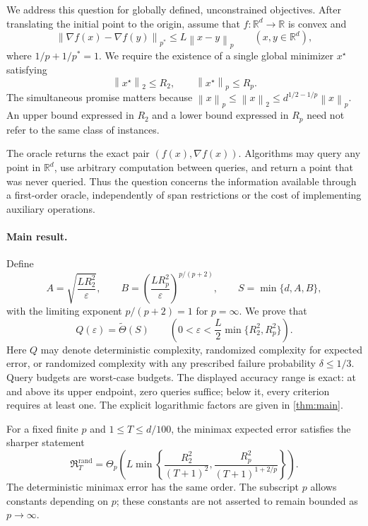\documentclass[11pt]{article}
\newcommand{\R}{\mathbb{R}}
\newcommand{\norm}[2]{\left\lVert #1\right\rVert_{#2}}
\newcommand{\Risk}{\mathfrak{R}}
\newcommand{\eps}{\varepsilon}
\theoremstyle{definition}
\theoremstyle{remark}
\begin{document}
We address this question for globally defined, unconstrained objectives.
After translating the initial point to the origin, assume that
$f:\R^d\to\R$ is convex and
\begin{equation}
\label{eq:intro-smooth}
 \norm{\nabla f(x)-\nabla f(y)}{p^*}
 \le L\norm{x-y}{p}\qquad(x,y\in\R^d),
\end{equation}
where $1/p+1/p^*=1$. We require the existence of a single global minimizer
$x^\star$ satisfying
\begin{equation}
\label{eq:intro-radii}
 \norm{x^\star}{2}\le R_2,
 \qquad \norm{x^\star}{p}\le R_p.
\end{equation}
The simultaneous promise matters because
$\norm{x}{p}\le\norm{x}{2}\le d^{1/2-1/p}\norm{x}{p}$.
An upper bound expressed in $R_2$ and a lower bound expressed in $R_p$
need not refer to the same class of instances.

The oracle returns the exact pair $(f(x),\nabla f(x))$. Algorithms may
query any point in $\R^d$, use arbitrary computation between queries, and
return a point that was never queried. Thus the question concerns the
information available through a first-order oracle, independently of
span restrictions or the cost of implementing auxiliary operations.

\paragraph{Main result.}
Define
\[
 A=\sqrt{\frac{LR_2^2}{\eps}},\qquad
 B=\left(\frac{LR_p^2}{\eps}\right)^{p/(p+2)},\qquad
 S=\min\{d,A,B\},
\]
with the limiting exponent $p/(p+2)=1$ for $p=\infty$.
We prove that
\begin{equation}
\label{eq:intro-frontier}
 Q(\eps)=\widetilde\Theta(S)
 \qquad\left(0<\eps<\frac L2\min\{R_2^2,R_p^2\}\right).
\end{equation}
Here $Q$ may denote deterministic complexity, randomized complexity for
expected error, or randomized complexity with any prescribed failure
probability $\delta\le1/3$. Query budgets are worst-case budgets.
The displayed accuracy range is exact: at and above its upper endpoint,
zero queries suffice; below it, every criterion requires at least one.
The explicit logarithmic factors are given in \cref{thm:main}.

For a fixed finite $p$ and $1\le T\le d/100$, the minimax expected error
satisfies the sharper statement
\begin{equation}
\label{eq:intro-risk}
 \Risk_T^{\mathrm{rand}}
 =\Theta_p\!\left(
 L\min\left\{\frac{R_2^2}{(T+1)^2},
              \frac{R_p^2}{(T+1)^{1+2/p}}\right\}\right).
\end{equation}
The deterministic minimax error has the same order. The subscript $p$
allows constants depending on $p$; these constants are not asserted to
remain bounded as $p\to\infty$.
\end{document}
